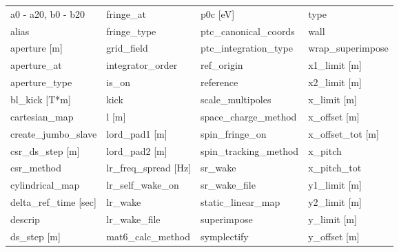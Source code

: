  \begin{tabular}{llll} \toprule
a0 - a20, b0 - b20               & fringe_at                        & p0c [eV]                         & type                             \\
alias                            & fringe_type                      & ptc_canonical_coords             & wall                             \\
aperture [m]                     & grid_field                       & ptc_integration_type             & wrap_superimpose                 \\
aperture_at                      & integrator_order                 & ref_origin                       & x1_limit [m]                     \\
aperture_type                    & is_on                            & reference                        & x2_limit [m]                     \\
bl_kick [T*m]                    & kick                             & scale_multipoles                 & x_limit [m]                      \\
cartesian_map                    & l [m]                            & space_charge_method              & x_offset [m]                     \\
create_jumbo_slave               & lord_pad1 [m]                    & spin_fringe_on                   & x_offset_tot [m]                 \\
csr_ds_step [m]                  & lord_pad2 [m]                    & spin_tracking_method             & x_pitch                          \\
csr_method                       & lr_freq_spread [Hz]              & sr_wake                          & x_pitch_tot                      \\
cylindrical_map                  & lr_self_wake_on                  & sr_wake_file                     & y1_limit [m]                     \\
delta_ref_time [sec]             & lr_wake                          & static_linear_map                & y2_limit [m]                     \\
descrip                          & lr_wake_file                     & superimpose                      & y_limit [m]                      \\
ds_step [m]                      & mat6_calc_method                 & symplectify                      & y_offset [m]                     \\

\end{tabular}
